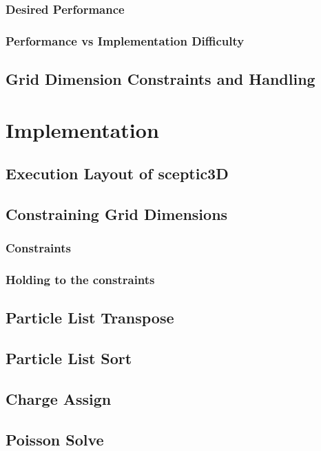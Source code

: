 \documentclass[12pt]{article} %
\begin{document}
		\subsubsection{Desired Performance}
		\subsubsection{Performance vs Implementation Difficulty}

	\subsection{Grid Dimension Constraints and Handling}

\section{Implementation}

	\subsection{Execution Layout of sceptic3D}

	\subsection{Constraining Grid Dimensions}
		\subsubsection{Constraints}
		\subsubsection{Holding to the constraints}

	\subsection{Particle List Transpose}

	\subsection{Particle List Sort}

	\subsection{Charge Assign}

	\subsection{Poisson Solve}
\end{document}
